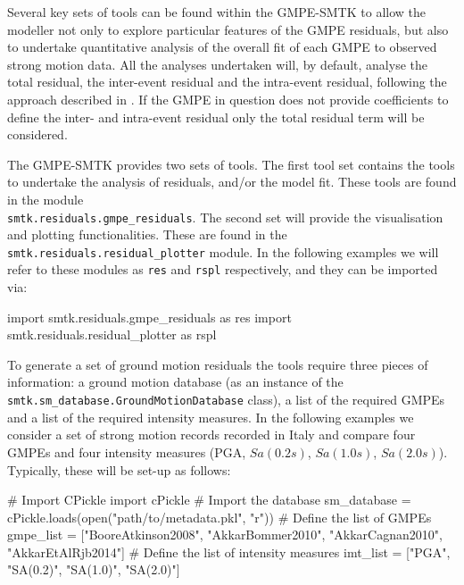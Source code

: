Several key sets of tools can be found within the GMPE-SMTK to allow the modeller not only to explore particular features of the GMPE residuals, but also to undertake quantitative analysis of the overall fit of each GMPE to observed strong motion data. All the analyses undertaken will, by default, analyse the total residual, the inter-event residual and the intra-event residual, following the approach described in \cite{Stafford_etal2008}. If the GMPE in question does not provide coefficients to define the inter- and intra-event residual only the total residual term will be considered.

The GMPE-SMTK provides two sets of tools. The first tool set contains the tools to undertake the analysis of residuals, and/or the model fit. These tools are found in the module \\ \verb=smtk.residuals.gmpe_residuals=. The second set will provide the visualisation and plotting functionalities. These are found in the \verb=smtk.residuals.residual_plotter= module. In the following examples we will refer to these modules as \verb=res= and \verb=rspl= respectively, and they can be imported via:

\begin{python}[frame=single]
import smtk.residuals.gmpe_residuals as res
import smtk.residuals.residual_plotter as rspl
\end{python}

To generate a set of ground motion residuals the tools require three pieces of information: a ground motion database (as an instance of the \verb=smtk.sm_database.GroundMotionDatabase= class), a list of the required GMPEs and a list of the required intensity measures. In the following examples we consider a set of strong motion records recorded in Italy and compare four GMPEs \citep{boore2008, AkkarBommer2010, AkkarCagnan2010, Akkar_etal2014} and four intensity measures (PGA, $Sa \left( {0.2 s} \right)$, $Sa \left( {1.0 s} \right)$, $Sa \left( {2.0 s} \right)$). Typically, these will be set-up as follows:

\begin{python}[frame=single]
# Import CPickle
import cPickle
# Import the database
sm_database = cPickle.loads(open("path/to/metadata.pkl", "r"))
# Define the list of GMPEs
gmpe_list = ["BooreAtkinson2008",
             "AkkarBommer2010",
             "AkkarCagnan2010",
             "AkkarEtAlRjb2014"]
# Define the list of intensity measures
imt_list = ["PGA", "SA(0.2)", "SA(1.0)", "SA(2.0)"] 
\end{python}

